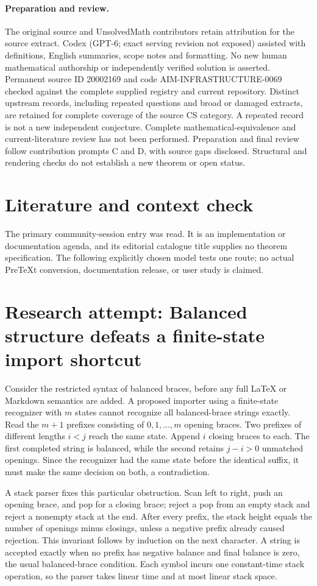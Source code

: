 \documentclass[11pt]{article}
\begin{document}
\paragraph{Preparation and review.}
The original source and UnsolvedMath contributors retain attribution for the source extract. Codex (GPT-6; exact serving revision not exposed) assisted with definitions, English summaries, scope notes and formatting. No new human mathematical authorship or independently verified solution is asserted. Permanent source ID 20002169 and code AIM-INFRASTRUCTURE-0069 checked against the complete supplied registry and current repository. Distinct upstream records, including repeated questions and broad or damaged extracts, are retained for complete coverage of the source CS category. A repeated record is not a new independent conjecture. Complete mathematical-equivalence and current-literature review has not been performed. Preparation and final review follow contribution prompts C and D, with source gaps disclosed. Structural and rendering checks do not establish a new theorem or open status.
\label{end:20002169}

\section{Literature and context check}
The primary community-session entry was read. It is an implementation or documentation agenda, and its editorial catalogue title supplies no theorem specification. The following explicitly chosen model tests one route; no actual PreTeXt conversion, documentation release, or user study is claimed.
\section{Research attempt: Balanced structure defeats a finite-state import shortcut}
Consider the restricted syntax of balanced braces, before any full LaTeX or Markdown semantics are added. A proposed importer using a finite-state recognizer with $m$ states cannot recognize all balanced-brace strings exactly. Read the $m+1$ prefixes consisting of $0,1,\ldots,m$ opening braces. Two prefixes of different lengths $i<j$ reach the same state. Append $i$ closing braces to each. The first completed string is balanced, while the second retains $j-i>0$ unmatched openings. Since the recognizer had the same state before the identical suffix, it must make the same decision on both, a contradiction.

A stack parser fixes this particular obstruction. Scan left to right, push an opening brace, and pop for a closing brace; reject a pop from an empty stack and reject a nonempty stack at the end. After every prefix, the stack height equals the number of openings minus closings, unless a negative prefix already caused rejection. This invariant follows by induction on the next character. A string is accepted exactly when no prefix has negative balance and final balance is zero, the usual balanced-brace condition. Each symbol incurs one constant-time stack operation, so the parser takes linear time and at most linear stack space.
\end{document}
